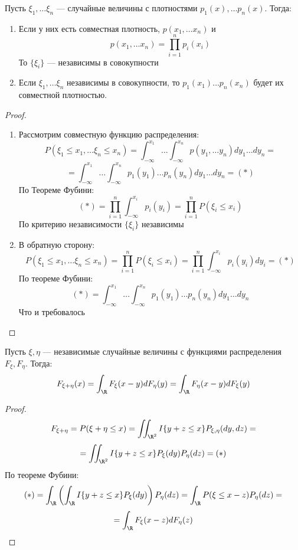 \begin{lemma}
    Пусть \(\xi_1, \dots \xi_n\) --- случайные величины с плотностями \(p_1(x), \dots p_n(x)\). Тогда:
    \begin{enumerate}
        \item Если у них есть совместная плотность, \(p(x_1, \dots x_n)\) и 
        \[p(x_1, \dots x_n) = \prod_{i = 1}^n p_i(x_i)\]
        То \(\{\xi_i\}\) --- независимы в совокупности
        \item Если \(\xi_1, \dots \xi_n\) независимы в совокупности, то \(p_1(x_1)\dots p_n(x_n)\) будет их совместной плотностью.
    \end{enumerate}
\end{lemma}
\begin{proof}
    \begin{enumerate}
        \item Рассмотрим совместную функцию распределения:
        \[P(\xi_1 \le x_1, \dots \xi_n \le x_n) = \int_{-\infty}^{x_1}\dots \int_{-\infty}^{x_n} p(y_1, \dots y_n)dy_1\dots dy_n = \]
        \[= \int_{-\infty}^{x_1}\dots \int_{-\infty}^{x_n} p_1(y_1) \dots p_n(y_n)dy_1\dots dy_n = (*)\]
        По Теореме Фубини:
        \[(*) = \prod_{i = 1}^n \int_{-\infty}^{x_i}p_i(y_i) = \prod_{i = 1}^n P(\xi_i \le x_i)\]
        По критерию независимости \(\{\xi_i\}\) независимы
        \item В обратную сторону:
        \[P(\xi_1 \le x_1, \dots \xi_n \le x_n) = \prod_{i = 1}^n P(\xi_i \le x_i) = \prod_{i = 1}^n \int_{-\infty}^{x_i}p_i(y_i)dy_i = (*)\]
        По теореме Фубини:
        \[(*) = \int_{-\infty}^{x_1}\dots \int_{-\infty}^{x_n}p_1(y_1)\dots p_n(y_n)dy_1\dots dy_n\]
        Что и требовалось
    \end{enumerate}
\end{proof}

\begin{lemma}
    Пусть \(\xi, \eta\) --- независимые случайные величины с функциями распределения \(F_\xi, F_\eta\). Тогда:
    \[F_{\xi + \eta}(x) = \int_\R F_\xi(x - y)dF_\eta(y) = \int_\R F_\eta(x - y)dF_\xi(y)\]
\end{lemma}
\begin{proof}
    \[F_{\xi + \eta} = P(\xi + \eta \le x) = \iint_{\R^2}I\{y + z \le x\}P_{\xi, \eta}(dy, dz) = \]
    \[ = \iint_{\R^2} I\{y + z \le x\}P_\xi(dy)P_\eta(dz) = (*)\]
    По теореме Фубини:
    \[(*) = \int_\R\left( \int_\R I\{y + z \le x\}P_\xi(dy) \right) P_\eta(dz) = \int_\R P(\xi \le x - z)P_\eta(dz) = \]
    \[ = \int_\R F_\xi(x - z)dF_\eta(z)\]
\end{proof}

